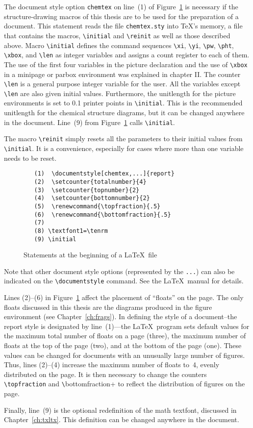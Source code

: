  The document style option \verb+chemtex+ on line~(1) of
 Figure~\ref{fg:preamble} is necessary if the
 structure-drawing macros of this thesis are to be used for
 the preparation of a document. This statement reads the file
 \verb+chemtex.sty+ into \TeX's memory, a file that contains the
 macros, \verb+\initial+ and \verb+\reinit+ as well as those
 described above. Macro \verb+\initial+
 defines the command sequences \verb+\xi+, \verb+\yi+, \verb+\pw+,
 \verb+\pht+, \verb+\xbox+, and \verb+\len+  as integer variables
 and assigns a count register to each of them.  The use of the
 first four variables in the picture declaration and the use
 of \verb+\xbox+ in a minipage or parbox environment was
 explained in chapter II. The counter \verb+\len+ is a general
 purpose integer variable for the user. All the variables
 except \verb+\len+ are also given initial values.
 Furthermore, the unitlength for the picture environments is
 set to 0.1 printer points in \verb+\initial+. This is the
 recommended unitlength for the chemical structure diagrams,
 but it can be changed anywhere in the document.
 Line~(9) from Figure~\ref{fg:preamble}
 calls \verb+\initial+.
 
 The macro \verb+\reinit+ simply resets all the parameters
 to their initial values from \verb+\initial+. It is a
 convenience, especially for cases where more than one
 variable needs to be reset.
 
 \begin{figure}\centering
  \begin{minipage}{10cm}
  \begin{verbatim}
   (1)  \documentstyle[chemtex,...]{report}
   (2)  \setcounter{totalnumber}{4}
   (3)  \setcounter{topnumber}{2}
   (4)  \setcounter{bottomnumber}{2}
   (5)  \renewcommand{\topfraction}{.5}
   (6)  \renewcommand{\bottomfraction}{.5}
   (7)  
   (8) \textfont1=\tenrm
   (9) \initial
  \end{verbatim}
  \end{minipage}
  \caption{Statements at the beginning of a \LaTeX\  file}
\label{fg:preamble}
 \end{figure}
 
Note that
 other document style options (represented by the \verb+...+) can
 also be indicated on the \verb+\documentstyle+ command. See the
 \LaTeX\ manual for details.
 
 Lines (2)--(6) in Figure~\ref{fg:preamble} affect the placement of
 ``floats'' on the page. The only floats discussed in this
 thesis are the diagrams produced in the figure
 environment (see Chapter~\ref{ch:frags}). In defining the style
 of a document--the report style is designated by
 line~(1)---the \LaTeX\  program sets default values for the maximum
 total number of floats on a page (three), the maximum
 number of floats at the top of the page (two), and at
 the bottom of the page (one). These values can be
 changed for documents with an unusually large number
 of figures. Thus, lines (2)--(4) increase the
 maximum number of floats to~4, evenly distributed on
 the page. It is then necessary to change the counters
 \verb+\topfraction+ and \verb+\+bottomfraction+ to
 reflect the distribution of figures on the page.
 
 Finally, line~(9) is the optional redefinition of the
 math textfont, discussed in Chapter~\ref{ch:txltx}. This definition
 can be changed anywhere in the document.
 
